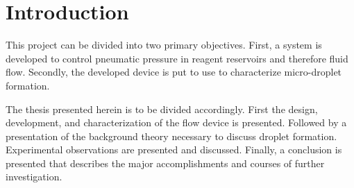 \chapter{Introduction}

This project can be divided into two primary objectives. First, a system is developed to control pneumatic pressure in reagent reservoirs and therefore fluid flow. Secondly, the developed device is put to use to characterize micro-droplet formation.

The thesis presented herein is to be divided accordingly. First the design, development, and characterization of the flow device is presented. Followed by a presentation of the background theory necessary to discuss droplet formation. Experimental observations are presented and discussed. Finally, a conclusion is presented that describes the major accomplishments and courses of further investigation.